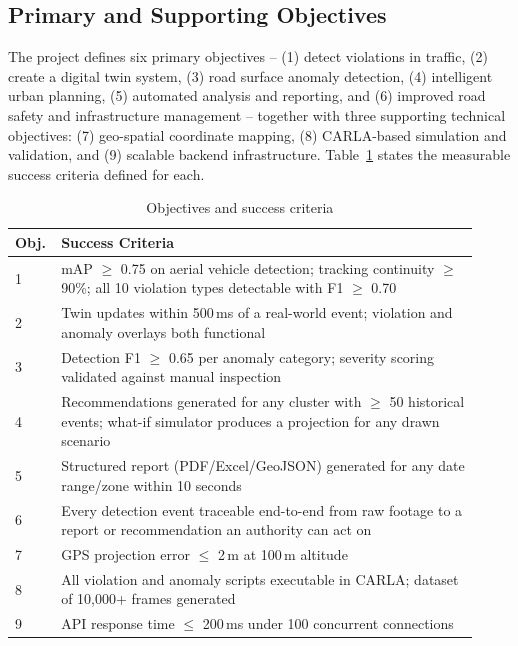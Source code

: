\documentclass[conference]{IEEEtran}
\begin{document}
\subsection{Primary and Supporting Objectives}

The project defines six primary objectives -- (1) detect violations in traffic, (2) create a digital twin system, (3) road surface anomaly detection, (4) intelligent urban planning, (5) automated analysis and reporting, and (6) improved road safety and infrastructure management -- together with three supporting technical objectives: (7) geo-spatial coordinate mapping, (8) CARLA-based simulation and validation, and (9) scalable backend infrastructure. Table~\ref{tab:objectives} states the measurable success criteria defined for each.

\begin{table}[htbp]
\caption{Objectives and success criteria}
\label{tab:objectives}
\centering
\footnotesize
\begin{tabular}{@{}p{0.06\linewidth}p{0.86\linewidth}@{}}
\toprule
\textbf{Obj.} & \textbf{Success Criteria} \\
\midrule
1 & mAP $\geq$ 0.75 on aerial vehicle detection; tracking continuity $\geq$ 90\%; all 10 violation types detectable with F1 $\geq$ 0.70 \\
2 & Twin updates within 500\,ms of a real-world event; violation and anomaly overlays both functional \\
3 & Detection F1 $\geq$ 0.65 per anomaly category; severity scoring validated against manual inspection \\
4 & Recommendations generated for any cluster with $\geq$ 50 historical events; what-if simulator produces a projection for any drawn scenario \\
5 & Structured report (PDF/Excel/GeoJSON) generated for any date range/zone within 10 seconds \\
6 & Every detection event traceable end-to-end from raw footage to a report or recommendation an authority can act on \\
7 & GPS projection error $\leq$ 2\,m at 100\,m altitude \\
8 & All violation and anomaly scripts executable in CARLA; dataset of 10,000+ frames generated \\
9 & API response time $\leq$ 200\,ms under 100 concurrent connections \\
\bottomrule
\end{tabular}
\end{table}
\end{document}
